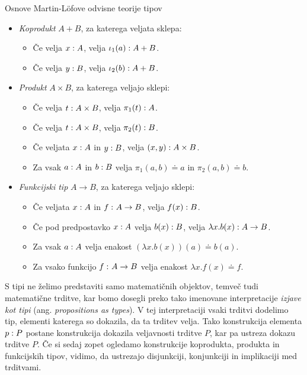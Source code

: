 \documentclass[a4paper, slovene]{article}
\begin{document}
\begin{section}{Osnove Martin-Löfove odvisne teorije tipov}
  \begin{itemize}
  \item \emph{Koprodukt} \(A + B\), za katerega veljata sklepa:
    \begin{itemize}
    \item Če velja \(x : A\), velja \(\iota_{1}(a) : A + B\).
    \item Če velja \(y : B\), velja \(\iota_{2}(b) : A + B\).
    \end{itemize}
  \item \emph{Produkt} \(A \times B\), za katerega veljajo sklepi:
    \begin{itemize}
    \item Če velja \(t : A \times B\), velja \(\pi_{1}(t) : A\).
    \item Če velja \(t : A \times B\), velja \(\pi_{2}(t) : B\).
    \item Če veljata \(x : A\) in \(y : B\), velja
      \((x, y) : A \times B\).
    \item Za vsak \(a : A\) in \(b : B\) velja
      \(\pi_{1}(a, b) \doteq a\) in \(\pi_{2}(a, b) \doteq b \).
    \end{itemize}
  \item \emph{Funkcijski tip} \(A \to B\), za katerega veljajo sklepi:
    \begin{itemize}
    \item Če veljata \(x : A\) in \(f \,\colon A \to B\), velja
      \(f(x) : B\).
    \item Če pod predpostavko \(x : A\) velja \(b(x) : B\),
      velja \(\lambda x.b(x) : A \to B\).
    \item Za vsak \(a : A\) velja enakost \((\lambda x.b(x))(a) \doteq b(a)\).
    \item Za vsako funkcijo \(f \,\colon A \to B\) velja enakost \(\lambda x.f(x) \doteq f\).
    \end{itemize}
  \end{itemize}

  S tipi ne želimo predstaviti samo matematičnih objektov,
  temveč tudi matematične trditve, kar bomo dosegli preko tako imenovane interpretacije
  \emph{izjave kot tipi} (ang. \emph{propositions as types}). V tej interpretaciji
  vsaki trditvi dodelimo tip, elementi katerega so dokazila, da ta trditev velja.
  Tako konstrukcija elementa \(p : P\) postane konstrukcija dokazila
  veljavnosti trditve \(P\), kar pa ustreza dokazu trditve \(P\). Če si sedaj zopet
  ogledamo konstrukcije koprodukta, produkta in funkcijskih tipov, vidimo, da ustrezajo
  disjunkciji, konjunkciji in implikaciji med trditvami.


\end{section}
\end{document}
